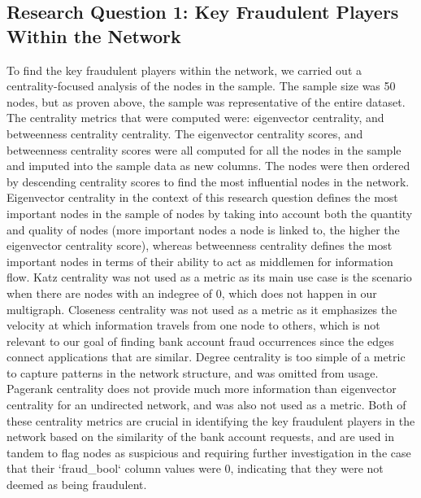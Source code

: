 \documentclass{styles/svproc}
\begin{document}
\subsection*{Research Question 1: Key Fraudulent Players Within the Network}
To find the key fraudulent players within the network, we carried out a centrality-focused analysis of the nodes in the sample. The sample size was 50 nodes, but as proven above, the sample was representative of the entire dataset. The centrality metrics that were computed were: eigenvector centrality, and betweenness centrality centrality.  
The eigenvector centrality scores, and betweenness centrality scores were all computed for all the nodes in the sample and imputed into the sample data as new columns. The nodes were then ordered by descending centrality scores to find the most influential nodes in the network. Eigenvector centrality in the context of this research question defines the most important nodes in the sample of nodes by taking into account both the quantity and quality of nodes (more important nodes a node is linked to, the higher the eigenvector centrality score), whereas betweenness centrality defines the most important nodes in terms of their ability to act as middlemen for information flow. Katz centrality was not used as a metric as its main use case is the scenario when there are nodes with an indegree of 0, which does not happen in our multigraph. Closeness centrality was not used as a metric as it emphasizes the velocity at which information travels from one node to others, which is not relevant to our goal of finding bank account fraud occurrences since the edges connect applications that are similar. Degree centrality is too simple of a metric to capture patterns in the network structure, and was omitted from usage. Pagerank centrality does not provide much more information than eigenvector centrality for an undirected network, and was also not used as a metric.
Both of these centrality metrics are crucial in identifying the key fraudulent players in the network based on the similarity of the bank account requests, and are used in tandem to flag nodes as suspicious and requiring further investigation in the case that their `fraud\_bool` column values were 0, indicating that they were not deemed as being fraudulent.
\end{document}
